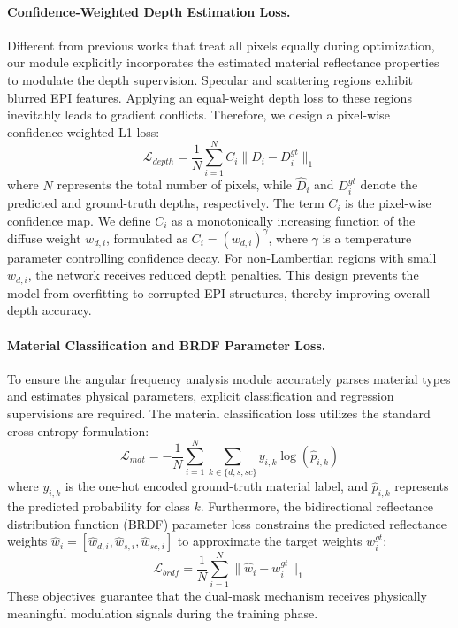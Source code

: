 \paragraph{Confidence-Weighted Depth Estimation Loss.}
Different from previous works that treat all pixels equally during optimization, our module explicitly incorporates the estimated material reflectance properties to modulate the depth supervision. Specular and scattering regions exhibit blurred EPI features. Applying an equal-weight depth loss to these regions inevitably leads to gradient conflicts. Therefore, we design a pixel-wise confidence-weighted L1 loss:
\begin{equation}
\label{eq:eq29}
\mathcal{L}_{depth} = \frac{1}{N} \sum_{i=1}^{N} C_i \| \hat{D}_i - D_i^{gt} \|_1
\end{equation}
where $N$ represents the total number of pixels, while $\hat{D}_i$ and $D_i^{gt}$ denote the predicted and ground-truth depths, respectively. The term $C_i$ is the pixel-wise confidence map. We define $C_i$ as a monotonically increasing function of the diffuse weight $w_{d,i}$, formulated as $C_i = (w_{d,i})^\gamma$, where $\gamma$ is a temperature parameter controlling confidence decay. For non-Lambertian regions with small $w_{d,i}$, the network receives reduced depth penalties. This design prevents the model from overfitting to corrupted EPI structures, thereby improving overall depth accuracy.

\paragraph{Material Classification and BRDF Parameter Loss.}
To ensure the angular frequency analysis module accurately parses material types and estimates physical parameters, explicit classification and regression supervisions are required. The material classification loss utilizes the standard cross-entropy formulation:
\begin{equation}
\label{eq:eq30}
\mathcal{L}_{mat} = -\frac{1}{N} \sum_{i=1}^{N} \sum_{k \in \{d, s, sc\}} y_{i,k} \log(\hat{p}_{i,k})
\end{equation}
where $y_{i,k}$ is the one-hot encoded ground-truth material label, and $\hat{p}_{i,k}$ represents the predicted probability for class $k$. Furthermore, the bidirectional reflectance distribution function (BRDF) parameter loss constrains the predicted reflectance weights $\hat{w}_i = [\hat{w}_{d,i}, \hat{w}_{s,i}, \hat{w}_{sc,i}]$ to approximate the target weights $w_i^{gt}$:
\begin{equation}
\label{eq:eq31}
\mathcal{L}_{brdf} = \frac{1}{N} \sum_{i=1}^{N} \| \hat{w}_i - w_i^{gt} \|_1
\end{equation}
These objectives guarantee that the dual-mask mechanism receives physically meaningful modulation signals during the training phase.

